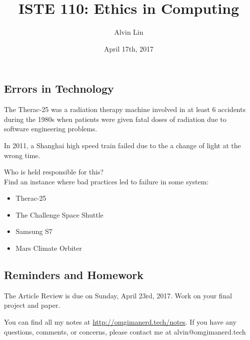 \documentclass{article}
\title{ISTE 110: Ethics in Computing}
\author{Alvin Lin}
\date{April 17th, 2017}
\begin{document}
\maketitle

\subsection*{Errors in Technology}
The Therac-25 was a radiation therapy machine involved in at least 6 accidents
during the 1980s when patients were given fatal doses of radiation due to
software engineering problems. \par
In 2011, a Shanghai high speed train failed due to the a change of light at
the wrong time. \par
Who is held responsible for this? \\
Find an instance where bad practices led to failure in some system:
\begin{itemize}
  \item Therac-25
  \item The Challenge Space Shuttle
  \item Samsung S7
  \item Mars Climate Orbiter
\end{itemize}

\subsection*{Reminders and Homework}
The Article Review is due on Sunday, April 23rd, 2017.
Work on your final project and paper.

\begin{center}
  You can find all my notes at \url{http://omgimanerd.tech/notes}. If you have
  any questions, comments, or concerns, please contact me at
  alvin@omgimanerd.tech
\end{center}
\end{document}
